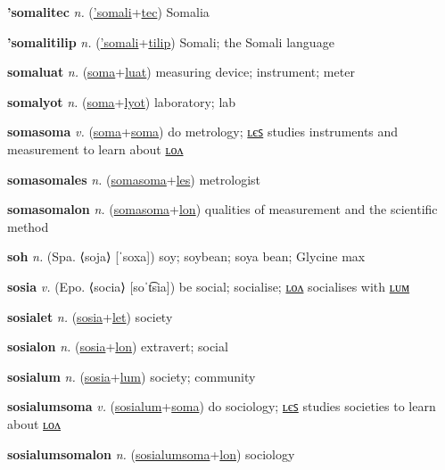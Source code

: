\textbf{\hypertarget{'somalitec}{'somalitec}} \textit{n.} (\hyperlink{'somali}{'somali}+\allowbreak \hyperlink{tec}{tec})
Somalia

\textbf{\hypertarget{'somalitilip}{'somalitilip}} \textit{n.} (\hyperlink{'somali}{'somali}+\allowbreak \hyperlink{tilip}{tilip})
Somali; the Somali language

\textbf{\hypertarget{somaluat}{somaluat}} \textit{n.} (\hyperlink{soma}{soma}+\allowbreak \hyperlink{luat}{luat})
measuring device; instrument; meter

\textbf{\hypertarget{somalyot}{somalyot}} \textit{n.} (\hyperlink{soma}{soma}+\allowbreak \hyperlink{lyot}{lyot})
laboratory; lab

\textbf{\hypertarget{somasoma}{somasoma}} \textit{v.} (\hyperlink{soma}{soma}+\allowbreak \hyperlink{soma}{soma})
do metrology; \hyperlink{somasomales}{ʟєꜱ} studies instruments and measurement to learn about \hyperlink{somasomalon}{ʟᴏᴧ}

\textbf{\hypertarget{somasomales}{somasomales}} \textit{n.} (\hyperlink{somasoma}{somasoma}+\allowbreak \hyperlink{les}{les})
metrologist

\textbf{\hypertarget{somasomalon}{somasomalon}} \textit{n.} (\hyperlink{somasoma}{somasoma}+\allowbreak \hyperlink{lon}{lon})
qualities of measurement and the scientific method

\textbf{\hypertarget{soh}{soh}} \textit{n.} (Spa. ⟨soja⟩ [ˈsoxa])
soy; soybean; soya bean; Glycine max

\textbf{\hypertarget{sosia}{sosia}} \textit{v.} (Epo. ⟨socia⟩ [soˈt͡sia])
be social; socialise; \hyperlink{sosialon}{ʟᴏᴧ} socialises with \hyperlink{sosialum}{ʟᴜᴍ}

\textbf{\hypertarget{sosialet}{sosialet}} \textit{n.} (\hyperlink{sosia}{sosia}+\allowbreak \hyperlink{let}{let})
society

\textbf{\hypertarget{sosialon}{sosialon}} \textit{n.} (\hyperlink{sosia}{sosia}+\allowbreak \hyperlink{lon}{lon})
extravert; social

\textbf{\hypertarget{sosialum}{sosialum}} \textit{n.} (\hyperlink{sosia}{sosia}+\allowbreak \hyperlink{lum}{lum})
society; community

\textbf{\hypertarget{sosialumsoma}{sosialumsoma}} \textit{v.} (\hyperlink{sosialum}{sosialum}+\allowbreak \hyperlink{soma}{soma})
do sociology; \hyperlink{sosialumsomales}{ʟєꜱ} studies societies to learn about \hyperlink{sosialumsomalon}{ʟᴏᴧ}

\textbf{\hypertarget{sosialumsomalon}{sosialumsomalon}} \textit{n.} (\hyperlink{sosialumsoma}{sosialumsoma}+\allowbreak \hyperlink{lon}{lon})
sociology

